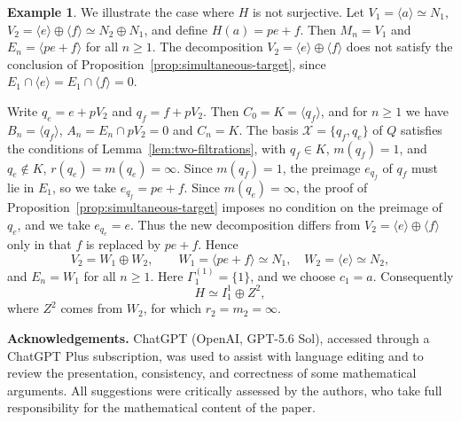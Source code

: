 \documentclass[11pt]{article}
\theoremstyle{definition}
\newtheorem{ex}[thm]{Example}
\begin{document}
\begin{ex}
	We illustrate the case where $H$ is not surjective.
	Let $V_1=\langle a\rangle\simeq N_1$,
	$V_2=\langle e\rangle\oplus\langle f\rangle\simeq N_2\oplus N_1$,
	and define $H(a)=pe+f$. Then $M_n=V_1$ and
	$E_n=\langle pe+f\rangle$ for all $n\geq1$. The decomposition
	$V_2=\langle e\rangle\oplus\langle f\rangle$ does not satisfy the
	conclusion of Proposition~\ref{prop:simultaneous-target}, since
	$E_1\cap\langle e\rangle=E_1\cap\langle f\rangle=0$.

	Write $q_e=e+pV_2$ and $q_f=f+pV_2$. Then $C_0=K=\langle q_f\rangle$,
	and for $n\geq1$ we have
	$B_n=\langle q_f\rangle$, $A_n=E_n\cap pV_2=0$ and $C_n=K$.
	The basis $\mathcal X=\{q_f,q_e\}$ of $Q$ satisfies the conditions
	of Lemma~\ref{lem:two-filtrations}, with $q_f\in K$, $m(q_f)=1$,
	and $q_e\notin K$, $r(q_e)=m(q_e)=\infty$.
		Since $m(q_f)=1$, the preimage $e_{q_f}$ of $q_f$ must lie in $E_1$, so we take
	$e_{q_f}=pe+f$. 	Since $m(q_e)=\infty$, the proof of Proposition~\ref{prop:simultaneous-target} imposes no
	condition on the preimage of $q_e$, and we take $e_{q_e}=e$.
		Thus the new decomposition differs from $V_2=\langle e\rangle\oplus\langle f\rangle$ only
	in that $f$ is replaced by $pe+f$.
	Hence
	$$
	V_2=W_1\oplus W_2,\qquad
	W_1=\langle pe+f\rangle\simeq N_1,\quad
	W_2=\langle e\rangle\simeq N_2,
	$$
	and $E_n=W_1$ for all $n\geq1$. Here $\Gamma_1^{(1)}=\{1\}$, and
	we choose $c_1=a$. Consequently
	$$
H\simeq I_1^1\oplus Z^2,
$$
where $Z^2$ comes from $W_2$, for which $r_2=m_2=\infty$.\end{ex}

{\bf Acknowledgements.} ChatGPT (OpenAI, GPT-5.6 Sol), accessed through a ChatGPT Plus subscription, was used to assist with language editing and to review the presentation, consistency, and correctness of some mathematical arguments. All suggestions were critically assessed by the authors, who take full responsibility for the mathematical content of the paper.
\end{document}
